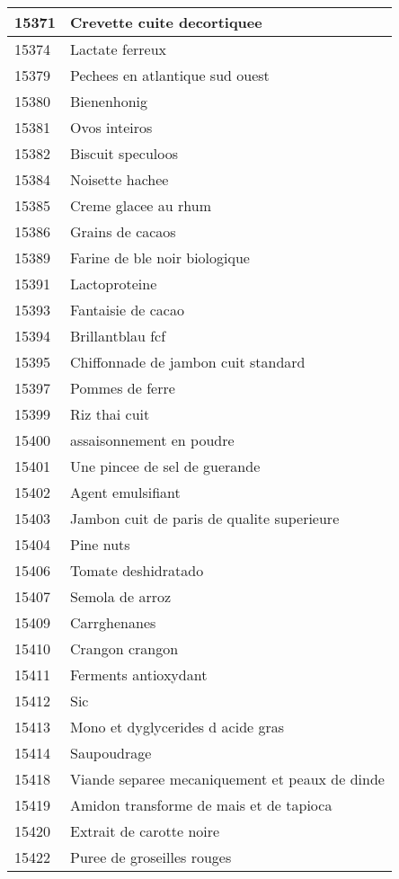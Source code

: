 \begin{longtable}{|l|l|}
15371 & Crevette cuite decortiquee \\ \hline 
15374 & Lactate ferreux \\ \hline 
15379 & Pechees en atlantique sud ouest \\ \hline 
15380 & Bienenhonig \\ \hline 
15381 & Ovos inteiros \\ \hline 
15382 & Biscuit speculoos \\ \hline 
15384 & Noisette hachee \\ \hline 
15385 & Creme glacee au rhum \\ \hline 
15386 & Grains de cacaos \\ \hline 
15389 & Farine de ble noir biologique \\ \hline 
15391 & Lactoproteine \\ \hline 
15393 & Fantaisie de cacao \\ \hline 
15394 & Brillantblau fcf \\ \hline 
15395 & Chiffonnade de jambon cuit standard \\ \hline 
15397 & Pommes de ferre \\ \hline 
15399 & Riz thai cuit \\ \hline 
15400 & assaisonnement en poudre \\ \hline 
15401 & Une pincee de sel de guerande \\ \hline 
15402 & Agent emulsifiant \\ \hline 
15403 & Jambon cuit de paris de qualite superieure \\ \hline 
15404 & Pine nuts \\ \hline 
15406 & Tomate deshidratado \\ \hline 
15407 & Semola de arroz \\ \hline 
15409 & Carrghenanes \\ \hline 
15410 & Crangon crangon \\ \hline 
15411 & Ferments antioxydant \\ \hline 
15412 & Sic \\ \hline 
15413 & Mono et dyglycerides d acide gras \\ \hline 
15414 & Saupoudrage \\ \hline 
15418 & Viande separee mecaniquement et peaux de dinde \\ \hline 
15419 & Amidon transforme de mais et de tapioca \\ \hline 
15420 & Extrait de carotte noire \\ \hline 
15422 & Puree de groseilles rouges \\ \hline 

\end{longtable}
